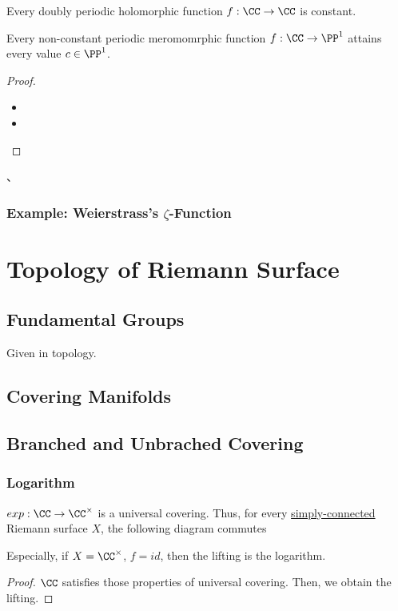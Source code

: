 \documentclass[Total.tex]{subfiles}
\begin{document}
				\begin{theorem}
					Every doubly periodic holomorphic function $f:\CC\rightarrow \CC$ is constant. 
					
					Every non-constant periodic meromomrphic function $f:\CC\rightarrow \PP^1$ attains every value $c\in \PP^1$. 
				\end{theorem}
				\begin{proof}
					\begin{itemize}
						\item 
						\item 
					\end{itemize}
				\end{proof}、
				
			\subsubsection{Example: Weierstrass's $\zeta$-Function}
				
		\section{Topology of Riemann Surface}
			\subsection{Fundamental Groups}
				Given in topology. 
			\subsection{Covering Manifolds}
			
			\subsection{Branched and Unbrached Covering}
				\subsubsection{Logarithm}
					\begin{proposition}
						$exp:\CC\rightarrow \CC^\times$ is a universal covering. Thus, for every 
					\underline{simply-connected} Riemann surface $X$, the following diagram commutes
						\begin{center}
						\end{center}
						
						Especially, if $X=\CC^\times$, $f=id$, then the lifting is the logarithm.
					\end{proposition}
					\begin{proof}
						$\CC$ satisfies those properties of universal covering. Then, we obtain the lifting. 
					\end{proof}
\end{document}
